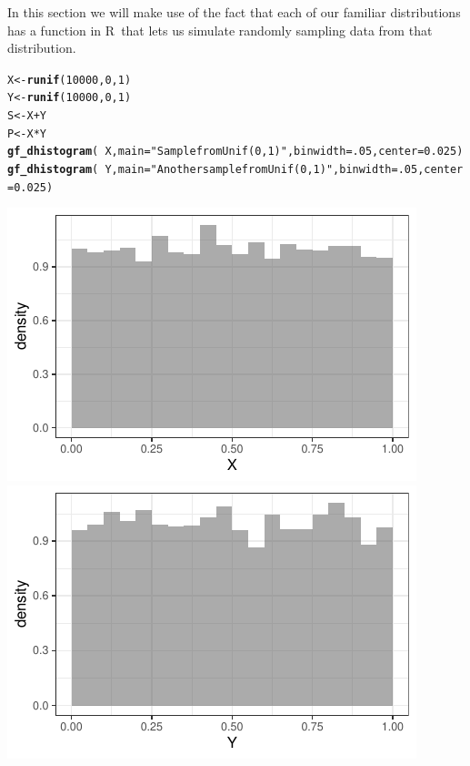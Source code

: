 \documentclass[twoside]{book}\usepackage[]{graphicx}\usepackage[]{xcolor}
\makeatletter
\def\maxwidth{ %
  \ifdim\Gin@nat@width>\linewidth
    \linewidth
  \else
    \Gin@nat@width
  \fi
}
\newcommand{\hlnum}[1]{\textcolor[rgb]{0.686,0.059,0.569}{#1}}%
\newcommand{\hlstr}[1]{\textcolor[rgb]{0.192,0.494,0.8}{#1}}%
\newcommand{\hlopt}[1]{\textcolor[rgb]{0,0,0}{#1}}%
\newcommand{\hlstd}[1]{\textcolor[rgb]{0.345,0.345,0.345}{#1}}%
\newcommand{\hlkwb}[1]{\textcolor[rgb]{0.69,0.353,0.396}{#1}}%
\newcommand{\hlkwc}[1]{\textcolor[rgb]{0.333,0.667,0.333}{#1}}%
\newcommand{\hlkwd}[1]{\textcolor[rgb]{0.737,0.353,0.396}{\textbf{#1}}}%
\newenvironment{kframe}{%
 \def\at@end@of@kframe{}%
 \ifinner\ifhmode%
  \def\at@end@of@kframe{\end{minipage}}%
  \begin{minipage}{\columnwidth}%
 \fi\fi%
 \def\FrameCommand##1{\hskip\@totalleftmargin \hskip-\fboxsep
 \colorbox{shadecolor}{##1}\hskip-\fboxsep
     \hskip-\linewidth \hskip-\@totalleftmargin \hskip\columnwidth}%
 \MakeFramed {\advance\hsize-\width
   \@totalleftmargin\z@ \linewidth\hsize
   \@setminipage}}%
 {\par\unskip\endMakeFramed%
 \at@end@of@kframe}
\newenvironment{knitrout}{}{} %
\def\R{{\sf R}}
\makeatother
\begin{document}
In this section we will make use of the fact that each of our familiar distributions
has a function in \R\ that lets us simulate randomly sampling data from that distribution.
\begin{knitrout}
\color{fgcolor}\begin{kframe}
\begin{alltt}
\hlstd{X} \hlkwb{<-} \hlkwd{runif}\hlstd{(}\hlnum{10000}\hlstd{,} \hlnum{0}\hlstd{,}\hlnum{1}\hlstd{)}
\hlstd{Y} \hlkwb{<-} \hlkwd{runif}\hlstd{(}\hlnum{10000}\hlstd{,} \hlnum{0}\hlstd{,}\hlnum{1}\hlstd{)}
\hlstd{S} \hlkwb{<-} \hlstd{X} \hlopt{+} \hlstd{Y}
\hlstd{P} \hlkwb{<-} \hlstd{X} \hlopt{*} \hlstd{Y}
\hlkwd{gf_dhistogram}\hlstd{(} \hlopt{~} \hlstd{X ,} \hlkwc{main} \hlstd{=} \hlstr{"Sample from Unif(0,1)"}\hlstd{,} \hlkwc{binwidth} \hlstd{=} \hlnum{.05}\hlstd{,} \hlkwc{center} \hlstd{=} \hlnum{0.025}\hlstd{)}
\hlkwd{gf_dhistogram}\hlstd{(} \hlopt{~} \hlstd{Y ,} \hlkwc{main} \hlstd{=} \hlstr{"Another sample from Unif(0,1)"}\hlstd{,} \hlkwc{binwidth} \hlstd{=} \hlnum{.05}\hlstd{,} \hlkwc{center} \hlstd{=} \hlnum{0.025}\hlstd{)}
\end{alltt}
\end{kframe}

{\centering \includegraphics[width=\maxwidth]{figures/fig-runif-1} 
\includegraphics[width=\maxwidth]{figures/fig-runif-2} 

}



\end{knitrout}
\end{document}
